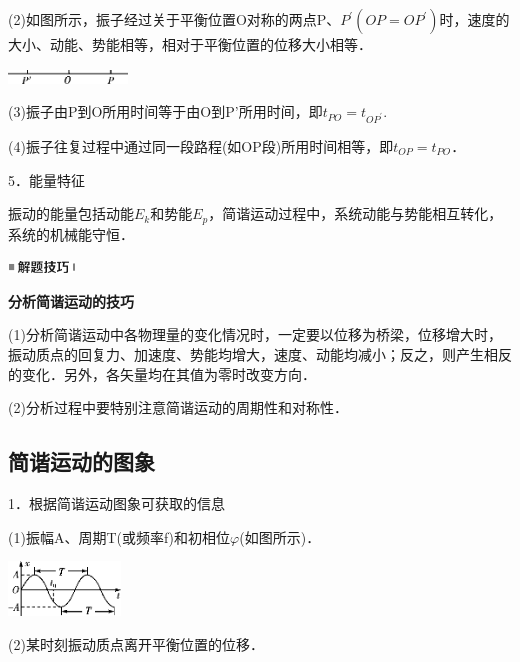 (2)如图所示，振子经过关于平衡位置O对称的两点P、$P^\prime(OP=OP^\prime)$时，速度的大小、动能、势能相等，相对于平衡位置的位移大小相等．

\begin{center}\includegraphics[width=1.25486in,height=0.14167in]{media/image515.png}\end{center}

(3)振子由P到O所用时间等于由O到P'所用时间，即$t_{PO}=t_{OP^\prime}$.　

(4)振子往复过程中通过同一段路程(如OP段)所用时间相等，即$t_{OP}=t_{PO}$．

5．能量特征

振动的能量包括动能$E_k$和势能$E_p$，简谐运动过程中，系统动能与势能相互转化，系统的机械能守恒．

\begin{center}\includegraphics[width=0.70764in,height=0.12292in]{media/image37.png}\end{center}
\begin{center}
  \textbf{分析简谐运动的技巧}
\end{center}

(1)分析简谐运动中各物理量的变化情况时，一定要以位移为桥梁，位移增大时，振动质点的回复力、加速度、势能均增大，速度、动能均减小；反之，则产生相反的变化．另外，各矢量均在其值为零时改变方向．

(2)分析过程中要特别注意简谐运动的周期性和对称性．

\newpage
\subsection{简谐运动的图象}

1．根据简谐运动图象可获取的信息

(1)振幅A、周期T(或频率f)和初相位$\varphi$(如图所示)．

\begin{center}\includegraphics[width=1.17917in,height=0.57569in]{media/image516.png}\end{center}

(2)某时刻振动质点离开平衡位置的位移．

